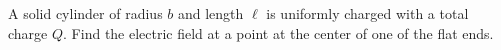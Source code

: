 A solid cylinder of radius $b$ and length $\ell$ is uniformly charged
with a total charge $Q$. Find the electric field at a point at the center
of one of the flat ends.
